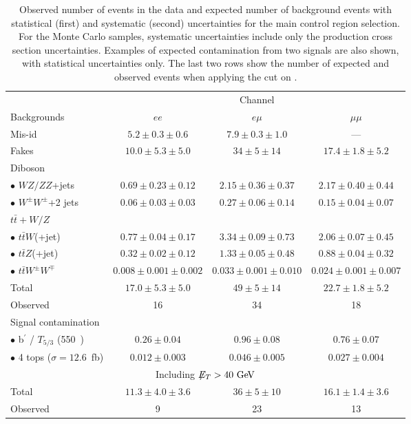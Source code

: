 \begin{table}[p]
  \begin{center}
    \caption{Observed number of events in the data and expected number of background events with 
        statistical (first) and systematic (second) uncertainties for the main control region
        selection. For the Monte Carlo samples, systematic uncertainties include only the production 
        cross section uncertainties.
        Examples of expected contamination from two signals are also shown, with
        statistical uncertainties only. The last two rows show the number of expected and observed
	events when applying the cut on \met{}.}\label{ctrl:ht2j_yield}
    \begin{tabular}{l|c|c|c}
      \hline\hline
       & \multicolumn{3}{c}{Channel} \\
      \cline{2-4}
      Backgrounds & $ee$ & $e\mu$ & $\mu\mu$ \\
      \hline
      Mis-id & $5.2\pm 0.3 \pm 0.6$ & $7.9\pm 0.3 \pm 1.0$ & --- \\
      Fakes & $10.0\pm 5.3 \pm 5.0$ & $34\pm 5 \pm 14$ & $17.4\pm 1.8 \pm 5.2$ \\
      \hline
      Diboson & & & \\
      $\bullet$ $WZ/ZZ$+jets & $0.69\pm 0.23 \pm 0.12$ & $2.15\pm 0.36\pm 0.37$ & $2.17\pm 0.40\pm 0.44$ \\
      $\bullet$ $W^{\pm}W^\pm$+2 jets & $0.06\pm 0.03\pm 0.03$ & $0.27\pm 0.06\pm 0.14$ & $0.15\pm 0.04\pm 0.07$ \\
      \hline
      $t\bar{t}+W/Z$ & & & \\
      $\bullet$ $t\bar{t}W$(+jet) & $0.77\pm 0.04\pm 0.17$ & $3.34\pm 0.09\pm 0.73$ & $2.06\pm 0.07\pm 0.45$ \\
      $\bullet$ $t\bar{t}Z$(+jet) & $0.32\pm 0.02\pm 0.12$ & $1.33\pm 0.05\pm 0.48$ & $0.88\pm 0.04\pm 0.32$ \\
      $\bullet$ $t\bar{t}W^{\pm}W^\mp$ & $0.008\pm 0.001\pm 0.002$ & $0.033\pm 0.001\pm 0.010$ & $0.024\pm 0.001\pm 0.007$ \\
      \hline
      Total & $17.0 \pm 5.3 \pm 5.0$ & $49 \pm 5 \pm 14$ & $22.7 \pm 1.8 \pm 5.2$ \\
      \hline
      Observed & 16 & 34 & 18 \\
      \hline
      Signal contamination & & & \\
      $\bullet$ b$^\prime$ / $T_{5/3}$ (550~\GeV{}) & $0.26\pm0.04$ & $0.96\pm0.08$ & $0.76\pm0.07$ \\
      $\bullet$ 4 tops ($\sigma=12.6$~fb) & $0.012\pm0.003$ & $0.046\pm0.005$ & $0.027\pm0.004$ \\
      \hline
      \multicolumn{4}{c}{Including $\met{}>40 \GeV$} \\
      \hline
      Total & $11.3 \pm 4.0 \pm 3.6$ & $36 \pm 5 \pm 10$ & $16.1 \pm 1.4 \pm 3.6$ \\
      \hline
      Observed & 9 & 23 & 13 \\
      \hline
    \end{tabular}


\end{center}
\end{table}
